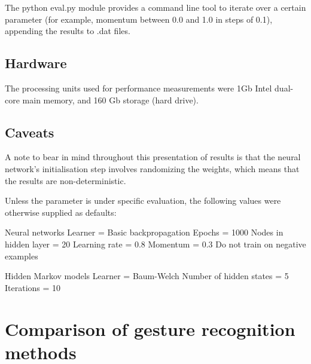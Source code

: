 \documentclass[12pt,a4,notitlepage]{report}
\renewcommand{\_}{\texttt{\symbol{95}}}
\newcommand{\<}{\texttt{\symbol{60}}}
\renewcommand{\>}{\texttt{\symbol{62}}}
\begin{document}
The python eval.py module provides a command line tool to iterate over a certain parameter (for example, momentum between 0.0 and 1.0 in steps of 0.1), appending the results to .dat files.

\subsection{Hardware}

The processing units used for performance measurements were 1Gb Intel dual-core main memory, and 160 Gb storage (hard drive).

\subsection{Caveats}

A note to bear in mind throughout this presentation of results is that the neural network's initialisation step involves randomizing the weights, which means that the results are non-deterministic.

Unless the parameter is under specific evaluation, the following values were otherwise supplied as defaults:

Neural networks
Learner = Basic backpropagation
Epochs = 1000
Nodes in hidden layer = 20
Learning rate = 0.8
Momentum = 0.3
Do not train on negative examples

Hidden Markov models
Learner = Baum-Welch
Number of hidden states = 5
Iterations = 10

\section{Comparison of gesture recognition methods}
\end{document}
